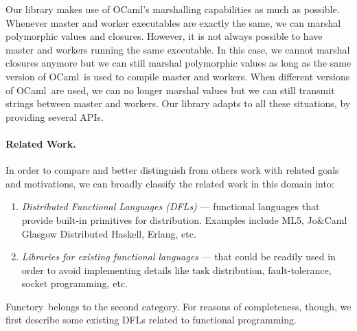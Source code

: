 \documentclass{llncs}
\newcommand{\Ocaml}{OCaml}
\newcommand{\functory}{\textsf{Functory}}
\newcommand{\JoCaml}{Jo{\&\!}Caml}
\begin{document}
Our library makes use of \Ocaml's marshalling capabilities as much as
possible. Whenever master and worker executables are exactly the same,
we can marshal polymorphic values and closures. However, it is not
always possible to have master and workers running the same
executable. In this case, we cannot marshal closures anymore but we
can still marshal polymorphic values as long as the same version of
\Ocaml\ is used to compile master and workers. When different versions
of \Ocaml\ are used, we can no longer marshal values but we can still
transmit strings between master and workers. Our library adapts to all
these situations, by providing several APIs.



\paragraph{Related Work.}
In order to compare and better distinguish
 from others work with related goals and motivations, we can
broadly classify the related work in this domain into:
\begin{enumerate}
\item \textit{Distributed Functional Languages (DFLs)} --- functional
  languages that provide built-in primitives for
  distribution. Examples include ML5, \JoCaml\, Glasgow Distributed
  Haskell, Erlang, etc.
\item \textit{Libraries for existing functional languages} --- that
  could be readily used in order to avoid implementing details like
  task distribution, fault-tolerance, socket programming, etc.
\end{enumerate}
\functory\ belongs to the second category.
For reasons of completeness, though, we first describe some existing DFLs
related to functional programming.
\end{document}
